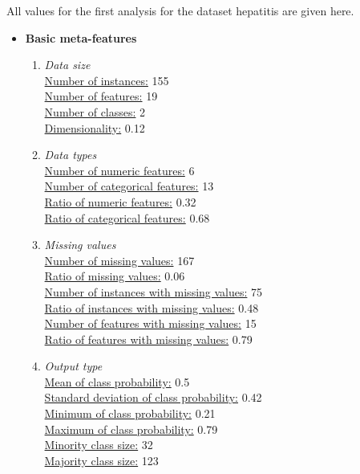 \documentclass[10pt,a4paper]{report}
\begin{document}
	All values for the first analysis for the dataset hepatitis are given here.
	
	\begin{itemize}
		\item \textbf{Basic meta-features}\\
		\begin{enumerate}
			\item \textit{Data size} \\
			\underline{Number of instances:} 155 \\
			\underline{Number of features:} 19\\
			\underline{Number of classes:} 2\\
			\underline{Dimensionality:} 0.12\\
			\item \textit{Data types} \\
			\underline{Number of numeric features:} 6 \\
			\underline{Number of categorical features:} 13 \\
			\underline{Ratio of numeric features:} 0.32 \\
			\underline{Ratio of categorical features:} 0.68 \\
			\item \textit{Missing values} \\
			\underline{Number of missing values:} 167 \\
			\underline{Ratio of missing values:} 0.06 \\
			\underline{Number of instances with missing values:} 75 \\
			\underline{Ratio of instances with missing values:} 0.48 \\
			\underline{Number of features with missing values:} 15 \\
			\underline{Ratio of features with missing values:} 0.79 \\
			\item \textit{Output type} \\
			\underline{Mean of class probability:} 0.5 \\
			\underline{Standard deviation of class probability:} 0.42 \\
			\underline{Minimum of class probability:} 0.21 \\
			\underline{Maximum of class probability:} 0.79 \\
			\underline{Minority class size:} 32 \\
			\underline{Majority class size:} 123 \\					

\end{enumerate}
\end{itemize}
\end{document}
